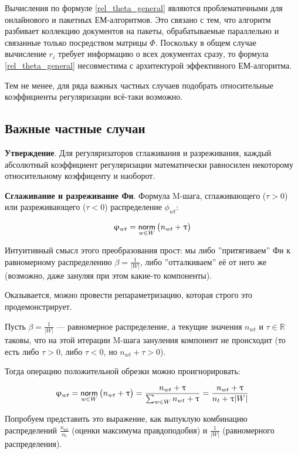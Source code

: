 Вычисления по формуле \ref{rel_theta_general} являются проблематичными для онлайнового и пакетных ЕМ-алгоритмов. Это связано с тем, что алгоритм разбивает коллекцию документов на пакеты, обрабатываемые параллельно и связанные только посредством матрицы $\Phi$. Поскольку в общем случае вычисление $r_i$ требует информацию о всех документах сразу, то формула \ref{rel_theta_general} несовместима с архитектурой эффективного ЕМ-алгоритма.

Тем не менее, для ряда важных частных случаев подобрать относительные коэффициенты регуляризации всё-таки возможно.

\subsection{Важные частные случаи}

\textbf{Утверждение}. Для регуляризаторов сглаживания и разреживания, каждый абсолютный коэффициент регуляризации математически равносилен некоторому относительному коэффиценту и наоборот.

\textbf{Сглаживание и разреживание Фи}. Формула M-шага, сглаживающего ($\tau > 0$) или разреживающего ($\tau < 0$) распределение $\phi_{wt}$:

\[
\upvarphi_{wt} = \mathop{\mathsf{norm}}\limits_{w \in W} \big( n_{wt} + \uptau \big)
\]

Интуитивный смысл этого преобразования прост: мы либо ''притягиваем'' Фи к равномерному распределению $\beta = \frac{1}{|W|}$, либо ''отталкиваем'' её от него же (возможно, даже зануляя при этом какие-то компоненты).

Оказывается, можно провести репараметризацию, которая строго это продемонстрирует. 

Пусть $\beta = \frac{1}{|W|}$ --- равномерное распределение, а текущие значения $n_{wt}$ и $\tau \in \mathbb{R}$ таковы, что на этой итерации M-шага зануления компонент не происходит (то есть либо $\tau > 0$, либо $\tau < 0$, но $n_{wt} + \tau > 0$).

Тогда операцию положительной обрезки можно проигнорировать:

\[
\upvarphi_{wt} = \mathop{\mathsf{norm}}\limits_{w \in W} \big( n_{wt} + \uptau \big) = \frac{n_{wt} + \uptau }{\sum_{w \in W} n_{wt} + \uptau } = \frac{n_{wt} + \uptau }{n_{t} + \uptau |W|}  
\]

Попробуем представить это выражение, как выпуклую комбинацию распределений  $\frac{n_{wt}}{n_t}$ (оценки максимума правдоподобия) и $\frac{1}{|W|}$ (равномерного распределения). 


